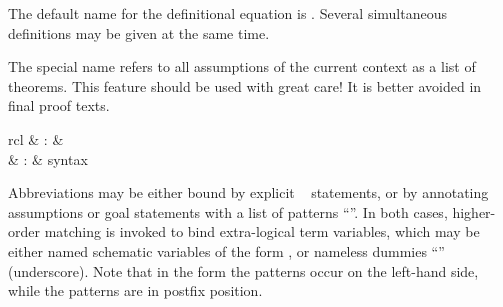 \begin{isabellebody}
\begin{isamarkuptext}
\begin{description}
  The default name for the definitional equation is .
  Several simultaneous definitions may be given at the same time.

  \end{description}

  The special name \hyperlink{fact.prems}{\mbox{}} refers to all assumptions of the
  current context as a list of theorems.  This feature should be used
  with great care!  It is better avoided in final proof texts.%
\end{isamarkuptext}%
\isamarkuptrue%
%
\isamarkuptrue%
%
\begin{isamarkuptext}%
\begin{matharray}{rcl}
    \hypertarget{command.let}{\hyperlink{command.let}{\mbox{}}} & : &  \\
    \hypertarget{keyword.is}{\hyperlink{keyword.is}{\mbox{}}} & : & syntax \\
  \end{matharray}

  Abbreviations may be either bound by explicit \hyperlink{command.let}{\mbox{}}~ statements, or by annotating assumptions or
  goal statements with a list of patterns ``''.  In both cases, higher-order matching is invoked to
  bind extra-logical term variables, which may be either named
  schematic variables of the form , or nameless dummies
  ``\hyperlink{variable.underscore}{\mbox{}}'' (underscore). Note that in the \hyperlink{command.let}{\mbox{}}
  form the patterns occur on the left-hand side, while the \hyperlink{keyword.is}{\mbox{}} patterns are in postfix position.


\end{isamarkuptext}
\end{isabellebody}

